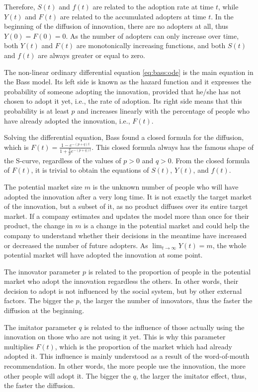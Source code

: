 Therefore, $S(t)$ and $f(t)$ are related to the adoption rate at time $t$, while $Y(t)$ and $F(t)$ are related to the accumulated adopters at time $t$. In the beginning of the diffusion of innovation, there are no adopters at all, thus $Y(0) = F(0) = 0$. As the number of adopters can only increase over time, both $Y(t)$ and $F(t)$ are monotonically increasing functions, and both $S(t)$ and $f(t)$ are always greater or equal to zero.

The non-linear ordinary differential equation \ref{eq:bass:ode} is the main equation in the Bass model. Its left side is known as the hazard function and it expresses the probability of someone adopting the innovation, provided that he/she has not chosen to adopt it yet, i.e., the rate of adoption. Its right side means that this probability is at least $p$ and increases linearly with the percentage of people who have already adopted the innovation, i.e., $F(t)$.

Solving the differential equation, Bass found a closed formula for the diffusion, which is $F(t) = \frac{ 1 - e^{-(p+q)t} }{ 1 + \frac{q}{p} e^{-(p+q)t} }$. This closed formula always has the famous shape of the S-curve, regardless of the values of $p > 0$ and $q > 0$. From the closed formula of $F(t)$, it is trivial to obtain the equations of $S(t)$, $Y(t)$, and $f(t)$.

The potential market size $m$ is the unknown number of people who will have adopted the innovation after a very long time. It is not exactly the target market of the innovation, but a subset of it, as no product diffuses over its entire target market. If a company estimates and updates the model more than once for their product, the change in $m$ is a change in the potential market and could help the company to understand whether their decisions in the meantime have increased or decreased the number of future adopters. As $\lim_{t \rightarrow \infty} Y(t) = m$, the whole potential market will have adopted the innovation at some point.

The innovator parameter $p$ is related to the proportion of people in the potential market who adopt the innovation regardless the others. In other words, their decision to adopt is not influenced by the social system, but by other external factors. The bigger the $p$, the larger the number of innovators, thus the faster the diffusion at the beginning.

The imitator parameter $q$ is related to the influence of those actually using the innovation on those who are not using it yet. This is why this parameter multiplies $F(t)$, which is the proportion of the market which had already adopted it. This influence is mainly understood as a result of the word-of-mouth recommendation. In other words, the more people use the innovation, the more other people will adopt it. The bigger the $q$, the larger the imitator effect, thus, the faster the diffusion.

